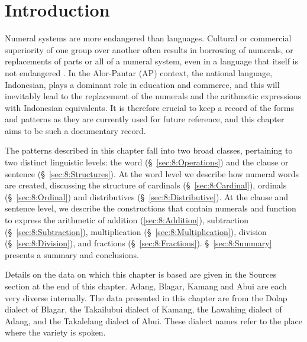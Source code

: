
\section{Introduction}
\label{sec:8:Introduction}
\hypertarget{Toc376958929}{}Numeral systems are more endangered than languages. Cultural or commercial superiority of one group over another often results in borrowing of numerals, or replacements of parts or all of a numeral system, even in a language that itself is not endangered \citep{Comrie2005numsys}. In the Alor-Pantar (AP) context, the national language, Indonesian, plays a dominant role in education and commerce, and this will inevitably lead to the replacement of the numerals and the arithmetic expressions with Indonesian equivalents. It is therefore crucial to keep a record of the forms and patterns as they are currently used for future reference, and this chapter aims to be such a documentary record. 


The patterns described in this chapter fall into two broad classes, pertaining to two distinct linguistic levels: the word ({\S}~\ref{sec:8:Operations}) and the clause or sentence ({\S}~\ref{sec:8:Structures}). At the word level we describe how numeral words are created, discussing the structure of cardinals ({\S}~\ref{sec:8:Cardinal}), ordinals ({\S}~\ref{sec:8:Ordinal}) and distributives ({\S}~\ref{sec:8:Distributive}). At the clause and sentence level, we describe the constructions that contain numerals and function to express the arithmetic of addition (\ref{sec:8:Addition}), subtraction ({\S}~\ref{sec:8:Subtraction}), multiplication ({\S}~\ref{sec:8:Multiplication}), division ({\S}~\ref{sec:8:Division}), and fractions ({\S}~\ref{sec:8:Fractions}). {\S}~\ref{sec:8:Summary} presents a summary and conclusions. 

Details on the data on which this chapter is based are given in the  Sources section at the end of this chapter. Adang, Blagar, Kamang and Abui are each very diverse internally. The data presented in this chapter are from the Dolap dialect of Blagar, the Takailubui dialect of Kamang, the Lawahing dialect of Adang, and the Takalelang dialect of Abui. These dialect names refer to the place where the variety is spoken.


